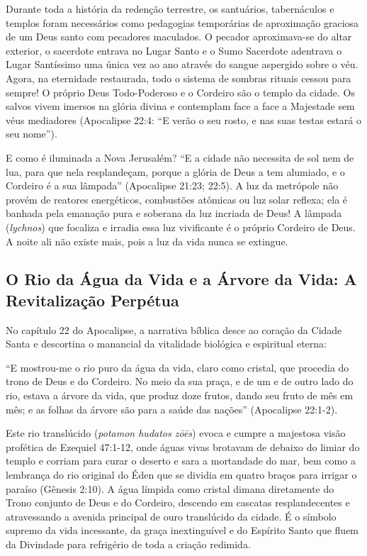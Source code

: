 Durante toda a história da redenção terrestre, os santuários, tabernáculos e templos foram necessários como pedagogias temporárias de aproximação graciosa de um Deus santo com pecadores maculados. O pecador aproximava-se do altar exterior, o sacerdote entrava no Lugar Santo e o Sumo Sacerdote adentrava o Lugar Santíssimo uma única vez ao ano através do sangue aspergido sobre o véu.
Agora, na eternidade restaurada, todo o sistema de sombras rituais cessou para sempre! O próprio Deus Todo-Poderoso e o Cordeiro são o templo da cidade. Os salvos vivem imersos na glória divina e contemplam face a face a Majestade sem véus mediadores (Apocalipse 22:4: ``E verão o seu rosto, e nas suas testas estará o seu nome'').

E como é iluminada a Nova Jerusalém?
``E a cidade não necessita de sol nem de lua, para que nela resplandeçam, porque a glória de Deus a tem alumiado, e o Cordeiro é a sua lâmpada'' (Apocalipse 21:23; 22:5).
A luz da metrópole não provém de reatores energéticos, combustões atômicas ou luz solar reflexa; ela é banhada pela emanação pura e soberana da luz incriada de Deus! A lâmpada (\textit{lychnos}) que focaliza e irradia essa luz vivificante é o próprio Cordeiro de Deus. A noite ali não existe mais, pois a luz da vida nunca se extingue.



\subsection{O Rio da Água da Vida e a Árvore da Vida: A Revitalização Perpétua}


No capítulo 22 do Apocalipse, a narrativa bíblica desce ao coração da Cidade Santa e descortina o manancial da vitalidade biológica e espiritual eterna:

``E mostrou-me o rio puro da água da vida, claro como cristal, que procedia do trono de Deus e do Cordeiro. No meio da sua praça, e de um e de outro lado do rio, estava a árvore da vida, que produz doze frutos, dando seu fruto de mês em mês; e as folhas da árvore são para a saúde das nações'' (Apocalipse 22:1-2).

Este rio translúcido (\textit{potamon hudatos zōēs}) evoca e cumpre a majestosa visão profética de Ezequiel 47:1-12, onde águas vivas brotavam de debaixo do limiar do templo e corriam para curar o deserto e sara a mortandade do mar, bem como a lembrança do rio original do Éden que se dividia em quatro braços para irrigar o paraíso (Gênesis 2:10).
A água límpida como cristal dimana diretamente do Trono conjunto de Deus e do Cordeiro, descendo em cascatas resplandecentes e atravessando a avenida principal de ouro translúcido da cidade. É o símbolo supremo da vida incessante, da graça inextinguível e do Espírito Santo que fluem da Divindade para refrigério de toda a criação redimida.

